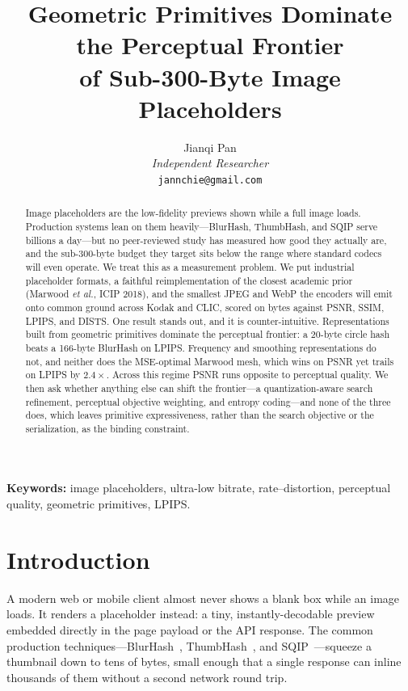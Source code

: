 \documentclass[11pt]{article}
\begin{document}
\title{Geometric Primitives Dominate the Perceptual Frontier\\
of Sub-300-Byte Image Placeholders}

\author{Jianqi Pan \\
\textit{Independent Researcher} \\
\texttt{jannchie@gmail.com}}
\date{}

\maketitle

\begin{abstract}
Image placeholders are the low-fidelity previews shown while a full image
loads. Production systems lean on them heavily---BlurHash, ThumbHash, and SQIP
serve billions a day---but no peer-reviewed study has measured how good they
actually are, and the sub-300-byte budget they target sits below the range
where standard codecs will even operate. We treat this as a measurement
problem. We put industrial placeholder formats, a faithful reimplementation of
the closest academic prior (Marwood \textit{et al.}, ICIP 2018), and the
smallest JPEG and WebP the encoders will emit onto common ground across Kodak
and CLIC, scored on bytes against PSNR, SSIM, LPIPS, and DISTS. One result
stands out, and it is counter-intuitive. Representations built from geometric
primitives dominate the perceptual frontier: a 20-byte circle hash beats a
166-byte BlurHash on LPIPS. Frequency and smoothing representations do not, and
neither does the MSE-optimal Marwood mesh, which wins on PSNR yet trails on
LPIPS by $2.4\times$. Across this regime PSNR runs opposite to perceptual
quality. We then ask whether anything else can shift the frontier---a
quantization-aware search refinement, perceptual objective weighting, and
entropy coding---and none of the three does, which leaves primitive
expressiveness, rather than the search objective or the serialization, as the
binding constraint.
\end{abstract}

\medskip
\noindent\textbf{Keywords:} image placeholders, ultra-low bitrate,
rate--distortion, perceptual quality, geometric primitives, LPIPS.

\section{Introduction}
A modern web or mobile client almost never shows a blank box while an image
loads. It renders a placeholder instead: a tiny, instantly-decodable preview
embedded directly in the page payload or the API response. The common
production techniques---BlurHash~\cite{blurhash}, ThumbHash~\cite{thumbhash},
and SQIP~\cite{sqip}---squeeze a thumbnail down to tens of bytes, small enough
that a single response can inline thousands of them without a second network
round trip.
\end{document}

